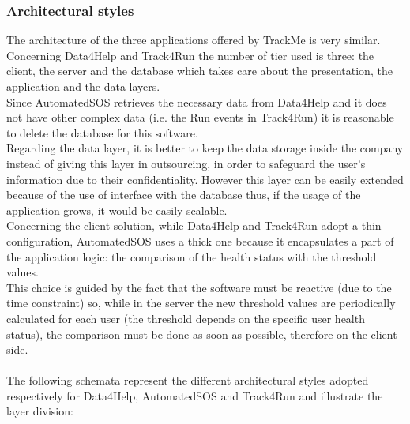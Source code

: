 \documentclass[a4paper]{article}
\begin{document}
\subsubsection{Architectural styles}
The architecture of the three applications offered by TrackMe is very similar.\\
Concerning Data4Help and Track4Run the number of tier used is three: the client, the server and the database which takes care about the presentation, the application and the data layers. \\
Since AutomatedSOS retrieves the necessary data from Data4Help and it does not have other complex data (i.e. the Run events in Track4Run) it is reasonable to delete the database for this software. \\
Regarding the data layer, it is better to keep the data storage inside the company instead of giving this layer in outsourcing, in order to safeguard the user's information due to their confidentiality. However this layer can be easily extended because of the use of interface with the database thus, if the usage of the application grows, it would be easily scalable. \\
Concerning the client solution, while Data4Help and Track4Run adopt a thin configuration, AutomatedSOS uses a thick one because it encapsulates a part of the application logic: the comparison of the health status with the threshold values.\\
This choice is guided by the fact that the software must be reactive (due to the time constraint) so, while in the server the new threshold values are periodically calculated for each user (the threshold depends on the specific user health status), the comparison must be done as soon as possible, therefore on the client side. \\ \\
The following schemata represent the different architectural styles adopted respectively for Data4Help, AutomatedSOS and Track4Run and illustrate the layer division:
\end{document}
